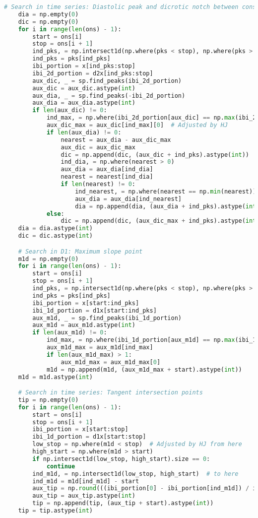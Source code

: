 \begin{lstlisting}[language=Python,label={lst:fidp.py}, basicstyle=\scriptsize]
    # Search in time series: Diastolic peak and dicrotic notch between consecutive onsets
    dia = np.empty(0)
    dic = np.empty(0)
    for i in range(len(ons) - 1):
        start = ons[i]
        stop = ons[i + 1]
        ind_pks, = np.intersect1d(np.where(pks < stop), np.where(pks > start))
        ind_pks = pks[ind_pks]
        ibi_portion = x[ind_pks:stop]
        ibi_2d_portion = d2x[ind_pks:stop]
        aux_dic, _ = sp.find_peaks(ibi_2d_portion)
        aux_dic = aux_dic.astype(int)
        aux_dia, _ = sp.find_peaks(-ibi_2d_portion)
        aux_dia = aux_dia.astype(int)
        if len(aux_dic) != 0:
            ind_max, = np.where(ibi_2d_portion[aux_dic] == np.max(ibi_2d_portion[aux_dic]))
            aux_dic_max = aux_dic[ind_max][0]  # Adjusted by HJ
            if len(aux_dia) != 0:
                nearest = aux_dia - aux_dic_max
                aux_dic = aux_dic_max
                dic = np.append(dic, (aux_dic + ind_pks).astype(int))
                ind_dia, = np.where(nearest > 0)
                aux_dia = aux_dia[ind_dia]
                nearest = nearest[ind_dia]
                if len(nearest) != 0:
                    ind_nearest, = np.where(nearest == np.min(nearest))
                    aux_dia = aux_dia[ind_nearest]
                    dia = np.append(dia, (aux_dia + ind_pks).astype(int))
            else:
                dic = np.append(dic, (aux_dic_max + ind_pks).astype(int))
    dia = dia.astype(int)
    dic = dic.astype(int)

    # Search in D1: Maximum slope point
    m1d = np.empty(0)
    for i in range(len(ons) - 1):
        start = ons[i]
        stop = ons[i + 1]
        ind_pks, = np.intersect1d(np.where(pks < stop), np.where(pks > start))
        ind_pks = pks[ind_pks]
        ibi_portion = x[start:ind_pks]
        ibi_1d_portion = d1x[start:ind_pks]
        aux_m1d, _ = sp.find_peaks(ibi_1d_portion)
        aux_m1d = aux_m1d.astype(int)
        if len(aux_m1d) != 0:
            ind_max, = np.where(ibi_1d_portion[aux_m1d] == np.max(ibi_1d_portion[aux_m1d]))
            aux_m1d_max = aux_m1d[ind_max]
            if len(aux_m1d_max) > 1:
                aux_m1d_max = aux_m1d_max[0]
            m1d = np.append(m1d, (aux_m1d_max + start).astype(int))
    m1d = m1d.astype(int)

    # Search in time series: Tangent intersection points
    tip = np.empty(0)
    for i in range(len(ons) - 1):
        start = ons[i]
        stop = ons[i + 1]
        ibi_portion = x[start:stop]
        ibi_1d_portion = d1x[start:stop]
        low_stop = np.where(m1d < stop)  # Adjusted by HJ from here
        high_start = np.where(m1d > start)
        if np.intersect1d(low_stop, high_start).size == 0:
            continue
        ind_m1d, = np.intersect1d(low_stop, high_start)  # to here
        ind_m1d = m1d[ind_m1d] - start
        aux_tip = np.round(((ibi_portion[0] - ibi_portion[ind_m1d]) / ibi_1d_portion[ind_m1d]) + ind_m1d)
        aux_tip = aux_tip.astype(int)
        tip = np.append(tip, (aux_tip + start).astype(int))
    tip = tip.astype(int)


\end{lstlisting}
